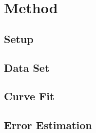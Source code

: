 \newpage
\section{Method} \label{sec:method}
\subsection{Setup}
\subsection{Data Set}
\subsection{Curve Fit}
\subsection{Error Estimation}


